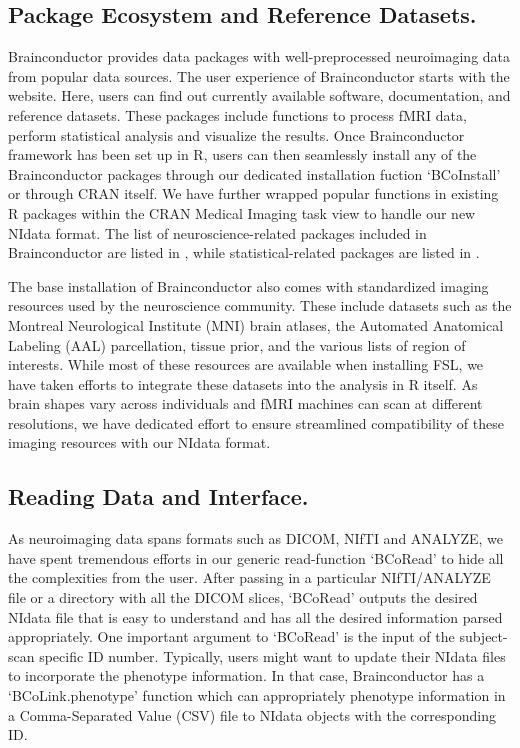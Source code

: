 \documentclass{nature}
\begin{document}
\subsection{Package Ecosystem and Reference Datasets.}
Brainconductor provides data packages with well-preprocessed neuroimaging data
from popular data sources.
The user experience of Brainconductor starts with the website. Here, users can
find out currently available software, documentation, and reference datasets.
These packages include functions to process fMRI data, perform statistical
analysis and visualize the results.
Once Brainconductor framework has been set up in R, users can then
seamlessly install any of the Brainconductor packages through our
dedicated installation fuction `BCoInstall' or through CRAN itself.
We have further wrapped popular functions in existing R packages
within the CRAN Medical Imaging task view to handle our new NIdata format.
The list of neuroscience-related packages included in Brainconductor are listed
in , while statistical-related packages are listed in
.


The base installation of Brainconductor also comes with standardized imaging
resources
used by the neuroscience community. These include datasets such
as the Montreal Neurological
Institute (MNI) brain atlases, the Automated Anatomical Labeling (AAL)
parcellation\cite{tzourio2002automated},
tissue prior,
and the various lists of region of interests. While most of these
resources are available when installing FSL, we have taken
efforts to integrate these datasets into the analysis in R itself.
As brain shapes vary across individuals
and fMRI machines can scan at different resolutions, we have
dedicated effort
to ensure streamlined compatibility of these imaging resources with our NIdata
format.

\subsection{Reading Data and Interface.}
As neuroimaging data spans formats such as DICOM, NIfTI and ANALYZE, we have
spent tremendous efforts in our generic read-function `BCoRead' to hide
all the complexities from the user. After passing in a particular NIfTI/ANALYZE
file
or a directory with all the DICOM slices, `BCoRead' outputs the desired NIdata
file
that is easy to understand and has all the desired information parsed
appropriately.
One important argument to `BCoRead' is the input of the subject-scan specific ID
number. 
Typically, users might want to update their NIdata files to incorporate the
phenotype information. In that case, Brainconductor has a `BCoLink.phenotype'
function
which can appropriately phenotype information in a Comma-Separated Value (CSV)
file
to NIdata objects with the corresponding ID.
\end{document}
